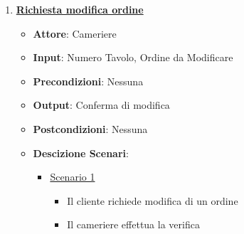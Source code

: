 \begin{enumerate}
    \item \uline {{\bf Richiesta modifica ordine}}
    \begin{itemize}
        \item {\bf Attore}: Cameriere
        \item {\bf Input}: Numero Tavolo, Ordine da Modificare
        \item {\bf Precondizioni}: Nessuna
        \item {\bf Output}: Conferma di modifica
        \item {\bf Postcondizioni}: Nessuna
        \item {\bf Descizione Scenari}:
        \begin{itemize}
            \item \uline{Scenario 1}
            \begin{itemize}
                \item Il cliente richiede modifica di un ordine
                \item Il cameriere effettua la verifica 
            \end{itemize}
        \end{itemize}
    \end{itemize}


\end{enumerate}

